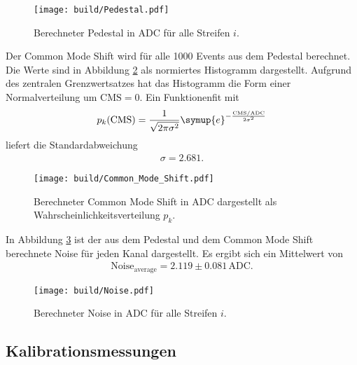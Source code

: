 \begin{figure}
  \centering
  \texttt{[image: build/Pedestal.pdf]}
  \caption{Berechneter Pedestal in ADC für alle Streifen $i$.}
  \label{fig:pedestals}
\end{figure}

Der Common Mode Shift wird für alle 1000 Events aus dem Pedestal berechnet.
Die Werte sind in Abbildung \ref{fig:cms} als normiertes Histogramm dargestellt.
Aufgrund des zentralen Grenzwertsatzes hat das Histogramm die Form einer Normalverteilung um $\text{CMS} = 0$.
Ein Funktionenfit mit
\begin{align}
  p_k(\text{CMS}) = \frac{1}{\sqrt{2 \pi \sigma^2}} \symup{e}^{-\frac{\text{CMS}/\text{ADC}}{2\sigma^2}}
\end{align}
liefert die Standardabweichung
\begin{align}
  \sigma = 2.681.
\end{align}

\begin{figure}
  \centering
  \texttt{[image: build/Common\_Mode\_Shift.pdf]}
  \caption{Berechneter Common Mode Shift in ADC dargestellt als Wahrscheinlichkeitsverteilung $p_k$.}
  \label{fig:cms}
\end{figure}

In Abbildung \ref{fig:noise} ist der aus dem Pedestal und dem Common Mode Shift berechnete Noise für jeden Kanal
dargestellt. Es ergibt sich ein Mittelwert von
\begin{align}
  \text{Noise}_\text{average} = 2.119 \pm 0.081 \, \text{ADC}.
\end{align}

\begin{figure}
  \centering
  \texttt{[image: build/Noise.pdf]}
  \caption{Berechneter Noise in ADC für alle Streifen $i$.}
  \label{fig:noise}
\end{figure}

\subsection{Kalibrationsmessungen}

